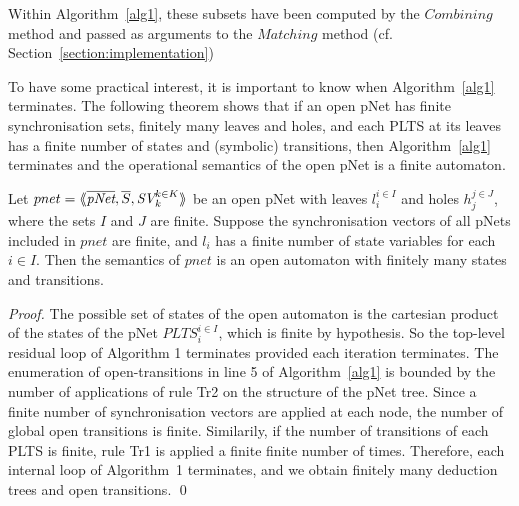 \documentclass[smallcondensed]{svjour3}
\newcommand{\TODO}[1]{\textcolor{red}{\textbf{[TODO:#1]}}}
\newcommand{\Pred}{\symb{Pred}}
\begin{document}

Within Algorithm~\ref{alg1}, these subsets have been computed by the
$Combining$ method and passed as arguments to the $Matching$ method
(cf. Section~\ref{section:implementation}) 

To have some practical interest, it is important to know when Algorithm~\ref{alg1} terminates. The following theorem shows that if an open pNet
has finite synchronisation sets, finitely many leaves and
holes, and each PLTS at its leaves has a finite number of states and
(symbolic) transitions, then Algorithm~\ref{alg1} terminates and the operational semantics of the open pNet is a finite automaton. 

\medskip
\begin{theorem}[Finiteness]\cite{henrio:Forte2016}
	Let $pnet=\mylangle \overline{\pNet},\overline{S}, \symb{SV}_k^{k\in K}\myrangle$ be an open pNet  with leaves $l_i^{i\in I}$ and holes $h_j^{j\in
		J}$, where the sets $I$ and $J$ are finite. Suppose the synchronisation vectors of all pNets 
	included in  $pnet$   are finite, and 
	$l_i $ has a finite number of state variables for each $i\in I$. Then the semantics of $pnet$ is an open automaton 
	with finitely many states and transitions.
\end{theorem}
\begin{proof}
  The possible set of states of the open automaton is the cartesian
  product of the states of the pNet $PLTS_i^{i\in I}$, which is finite by
  hypothesis. So the top-level residual loop of Algorithm 1 terminates provided each 
  iteration terminates. The enumeration of open-transitions in line 5 of Algorithm~\ref{alg1} is bounded by the
  number of applications of rule Tr2 on the structure of the
  pNet tree. Since a finite number of synchronisation vectors are applied
  at each node, the number of global open transitions is finite. Similarily, if the number
  of transitions of each PLTS is finite, rule Tr1 is 
  applied a finite finite number of times. Therefore, each internal loop of Algorithm~1 terminates, and we obtain finitely many deduction trees and
  open transitions.
  \hfill \qed
  \end{proof}
\end{document}

